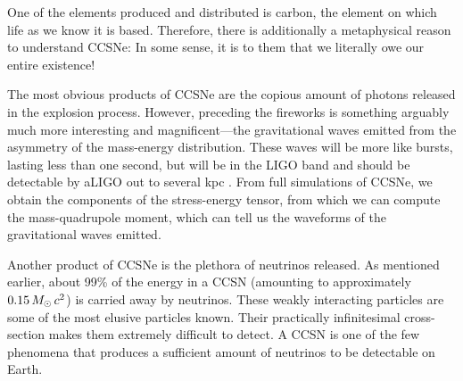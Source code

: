 One of the elements produced and distributed is carbon,
the element on which life as we know it is based.
Therefore, there is additionally
a metaphysical reason to understand CCSNe:
In some sense, it is to them that we literally owe our entire existence!

The most obvious products of CCSNe are the copious amount of photons
released in the explosion process.
However, preceding the fireworks is something arguably much more interesting
and magnificent---the gravitational waves emitted from the asymmetry of the
mass-energy distribution.
These waves will be more like bursts, lasting less than one second,
but will be in the LIGO band and should be detectable by aLIGO
out to several kpc \citep{aaa2016}.
From full simulations of CCSNe, we obtain the components of the stress-energy
tensor, from which we can compute the mass-quadrupole moment,
which can tell us the waveforms of the gravitational waves emitted.

Another product of CCSNe is the plethora of neutrinos released.
As mentioned earlier, about 99\% of the energy in a CCSN
(amounting to approximately $0.15\,M_{\odot}\,c^{2}$) is carried away by neutrinos.
These weakly interacting particles are some of the most elusive particles known.
Their practically infinitesimal cross-section makes them extremely difficult
to detect.
A CCSN is one of the few phenomena that produces a sufficient amount of
neutrinos to be detectable on Earth.


